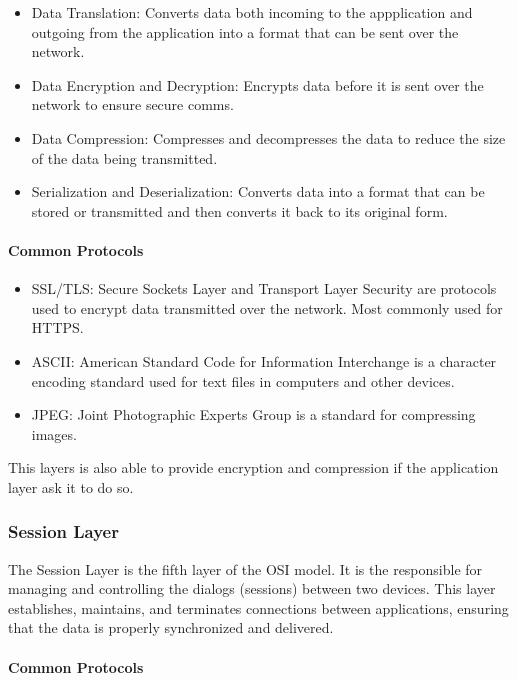 \documentclass[a4paper]{article}
\begin{document}
    \begin{itemize}
        \item Data Translation: Converts data both incoming to the appplication and outgoing from the application into a format that can be sent over the network.
        \item Data Encryption and Decryption: Encrypts data before it is sent over the network to ensure secure comms.
        \item Data Compression: Compresses and decompresses the data to reduce the size of the data being transmitted.
        \item Serialization and Deserialization: Converts data into a format that can be stored or transmitted and then converts it back to its original form.
    \end{itemize}

    \paragraph*{Common Protocols}

    \begin{itemize}
        \item SSL/TLS: Secure Sockets Layer and Transport Layer Security are protocols used to encrypt data transmitted over the network. Most commonly used for HTTPS.
        \item ASCII: American Standard Code for Information Interchange is a character encoding standard used for text files in computers and other devices.
        \item JPEG: Joint Photographic Experts Group is a standard for compressing images.
    \end{itemize}

    This layers is also able to provide encryption and compression if the application layer ask it to do so.


    \subsubsection{Session Layer} The Session Layer is the fifth layer of the OSI model. It is the responsible for managing and controlling the dialogs (sessions)  between two devices. This layer establishes, maintains, and terminates connections between applications, ensuring that the data is properly synchronized and delivered.

    \paragraph{Common Protocols}
\end{document}
